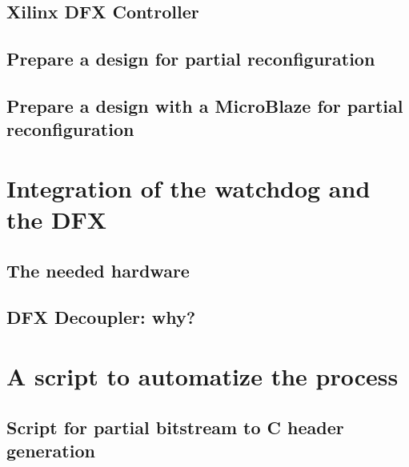 \subsection{Xilinx DFX Controller}
\subsection{Prepare a design for partial reconfiguration}
\subsection{Prepare a design with a MicroBlaze for partial reconfiguration}

\section{Integration of the watchdog and the DFX}
\subsection{The needed hardware}
\subsection{DFX Decoupler: why?}

\section{A script to automatize the process}
\subsection{Script for partial bitstream to C header generation}